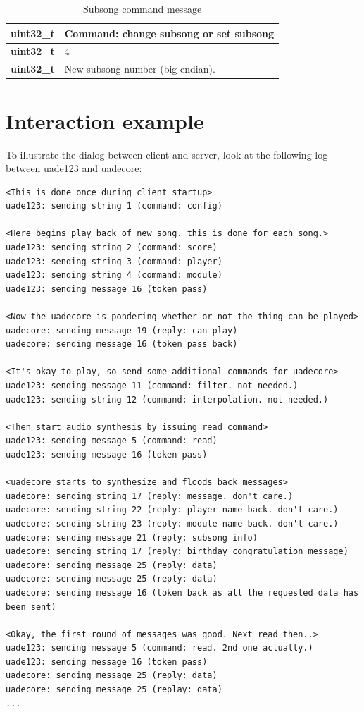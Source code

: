 \documentclass{article}
\begin{document}
\begin{table}
\begin{center}
\caption{Subsong command message}
\label{tab:command_subsong}
\begin{tabular}{|r|l|}
\hline
\textbf{uint32\_t} & Command: change subsong or set subsong\\
\hline
\textbf{uint32\_t} & 4\\
\hline
\textbf{uint32\_t} & New subsong number (big-endian).\\
\hline
\end{tabular}
\end{center}
\end{table}

\section{Interaction example}

To illustrate the dialog between client and server, look at the following log
between uade123 and uadecore:
\begin{verbatim}
<This is done once during client startup>
uade123: sending string 1 (command: config)

<Here begins play back of new song. this is done for each song.>
uade123: sending string 2 (command: score)
uade123: sending string 3 (command: player)
uade123: sending string 4 (command: module)
uade123: sending message 16 (token pass)

<Now the uadecore is pondering whether or not the thing can be played>
uadecore: sending message 19 (reply: can play)
uadecore: sending message 16 (token pass back)

<It's okay to play, so send some additional commands for uadecore>
uade123: sending message 11 (command: filter. not needed.)
uade123: sending string 12 (command: interpolation. not needed.)

<Then start audio synthesis by issuing read command>
uade123: sending message 5 (command: read)
uade123: sending message 16 (token pass)

<uadecore starts to synthesize and floods back messages>
uadecore: sending string 17 (reply: message. don't care.)
uadecore: sending string 22 (reply: player name back. don't care.)
uadecore: sending string 23 (reply: module name back. don't care.)
uadecore: sending message 21 (reply: subsong info)
uadecore: sending string 17 (reply: birthday congratulation message)
uadecore: sending message 25 (reply: data)
uadecore: sending message 25 (reply: data)
uadecore: sending message 16 (token back as all the requested data has been sent)

<Okay, the first round of messages was good. Next read then..>
uade123: sending message 5 (command: read. 2nd one actually.)
uade123: sending message 16 (token pass)
uadecore: sending message 25 (reply: data)
uadecore: sending message 25 (replay: data)
...
\end{verbatim}
\end{document}
